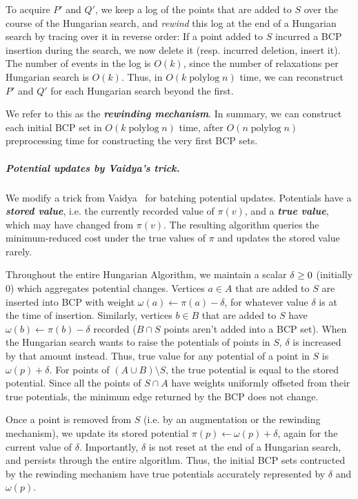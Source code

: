 \documentclass[a4paper,UKenglish]{socg-lipics-v2018}
\def\polylog{\mathop{\mathrm{polylog}}}
\theoremstyle{plain}
\numberwithin{figure}{section}
\renewcommand{\paragraph}{\subparagraph}
\def\EMPH#1{\textbf{\emph{\boldmath #1}}}
\begin{document}
To acquire $P'$ and $Q'$, we keep a log of the points that are added to $S$
over the course of the Hungarian search, and \emph{rewind} this log at the
end of a Hungarian search by tracing over it in reverse order:
If a point added to $S$ incurred a BCP insertion during the search,
we now delete it (resp. incurred deletion, insert it).
The number of events in the log is $O(k)$, since the number of relaxations per
Hungarian search is $O(k)$.
Thus, in $O(k\polylog n)$ time, we can reconstruct $P'$ and $Q'$ for each
Hungarian search beyond the first.

We refer to this as the \EMPH{rewinding mechanism}.
In summary, we can construct each initial BCP set in $O(k\polylog n)$ time,
after $O(n\polylog n)$ preprocessing time for constructing the very first
BCP sets.

\paragraph{Potential updates by Vaidya's trick.}
We modify a trick from Vaidya~\cite{Vaidya89} for batching potential updates.
Potentials have a \EMPH{stored value}, i.e. the currently recorded value of
$\pi(v)$, and a \EMPH{true value}, which may have changed from $\pi(v)$.
The resulting algorithm queries the minimum-reduced cost under the true values
of $\pi$ and updates the stored value rarely.

Throughout the entire Hungarian Algorithm, we maintain a scalar
$\EMPH{$\delta$} \geq 0$ (initially 0) which aggregates potential changes.
Vertices $a \in A$ that are added to $S$ are inserted into BCP with weight
$\omega(a) \gets \pi(a) - \delta$, for whatever value $\delta$ is at the time
of insertion.
Similarly, vertices $b \in B$ that are added to $S$ have $\omega(b) \gets \pi(b) - \delta$
recorded ($B \cap S$ points aren't added into a BCP set).
When the Hungarian search wants to raise the potentials of points in $S$,
$\delta$ is increased by that amount instead.
Thus, true value for any potential of a point in $S$ is $\omega(p) + \delta$.
For points of $(A \cup B) \setminus S$, the true potential is equal to the
stored potential.
Since all the points of $S \cap A$ have weights uniformly offseted from their
true potentials, the minimum edge returned by the BCP does not change.

Once a point is removed from $S$ (i.e. by an augmentation or the rewinding
mechanism), we update its stored potential $\pi(p) \gets \omega(p) + \delta$,
again for the current value of $\delta$.
Importantly, $\delta$ is not reset at the end of a Hungarian search, and
persists through the entire algorithm.
Thus, the initial BCP sets contructed by the rewinding mechanism have true
potentials accurately represented by $\delta$ and $\omega(p)$.
\end{document}
